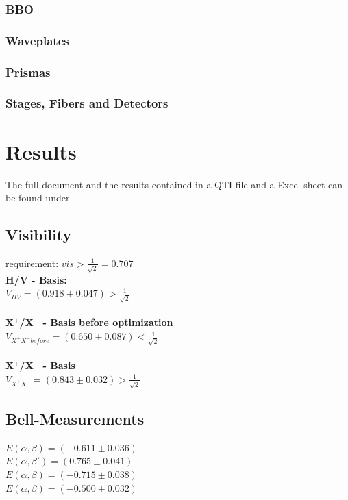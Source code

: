 \documentclass[12pt,a4paper]{article}
\begin{document}
\begin{multicols}{2}
\subsubsection{BBO}
\subsubsection{Waveplates}
\subsubsection{Prismas}
\subsubsection{Stages, Fibers and Detectors}

\section{Results}
The full document and the results contained in a QTI file and a Excel sheet can be found under \cite{github}
\subsection{Visibility}
requirement: $vis > \frac{1}{\sqrt{2}} = 0.707$\\

\noindent \textbf{H/V - Basis:}\\

$V_{HV}= (0.918 \pm 0.047) > \frac{1}{\sqrt{2}}$\\
\\
\textbf{X$^+$/X$^-$ - Basis before optimization}\\

$V_{X^+ X^- before}=(0.650 \pm 0.087) < \frac{1}{\sqrt{2}}$\\
\\
\textbf{X$^+$/X$^-$ - Basis}\\

$V_{X^+ X^- }=(0.843 \pm 0.032) > \frac{1}{\sqrt{2}}$\\

\subsection{Bell-Measurements}
$E(\alpha, \beta) = (-0.611 \pm 0.036)$\\
$E(\alpha, \beta ') = (0.765 \pm 0.041)$\\
$E(\alpha, \beta) = (-0.715\pm 0.038)$\\
$E(\alpha, \beta) = (-0.500 \pm 0.032)$\\


\end{multicols}
\end{document}
